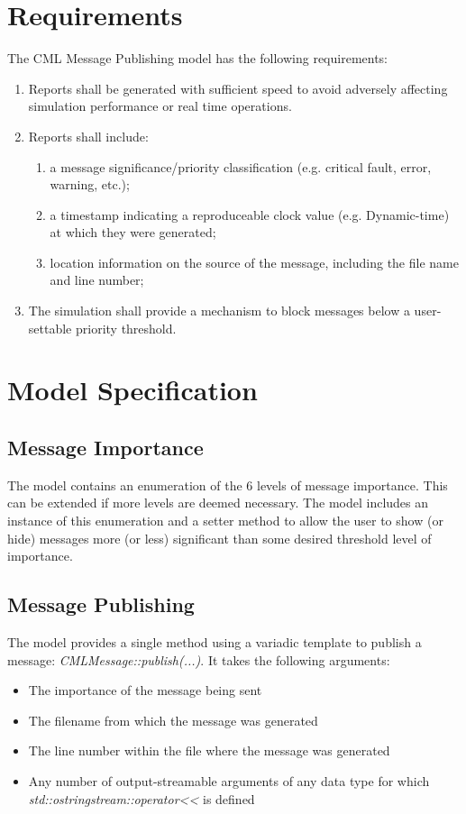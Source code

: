 \documentclass[11pt,fleqn]{report}
\begin{document}
\chapter {Requirements}
The CML Message Publishing model has the following requirements:
\begin{enumerate}
\item Reports shall be generated with sufficient speed to avoid
      adversely affecting simulation performance or real time operations. 
\item Reports shall include: 
  \begin{enumerate}
  \item a message significance/priority classification
        (e.g. critical fault, error, warning, etc.); 
  \item a timestamp indicating a reproduceable clock value
        (e.g. Dynamic-time) at which they were generated; 
  \item location information on the source of the message,
        including the file name and line number; 
  \end{enumerate}
\item The simulation shall provide a mechanism to block messages below a
      user-settable priority threshold.
\end{enumerate}



\chapter {Model Specification}
\section{Message Importance}
The model contains an enumeration of the 6 levels of message importance. This
can be extended if more levels are deemed necessary.
The model includes an instance of this enumeration and a setter method to allow
the user to show (or hide) messages more (or less) significant than some
desired threshold level of importance.

\section{Message Publishing}
The model provides a single method using a variadic template to publish a
message: \textit{CMLMessage::publish(...)}. It takes the following arguments:
\begin{itemize}
\item The importance of the message being sent
\item The filename from which the message was generated
\item The line number within the file where the message was generated
\item Any number of output-streamable arguments of any data type for which \textit{std::ostringstream::operator<<} is defined
\end{itemize}
\end{document}
